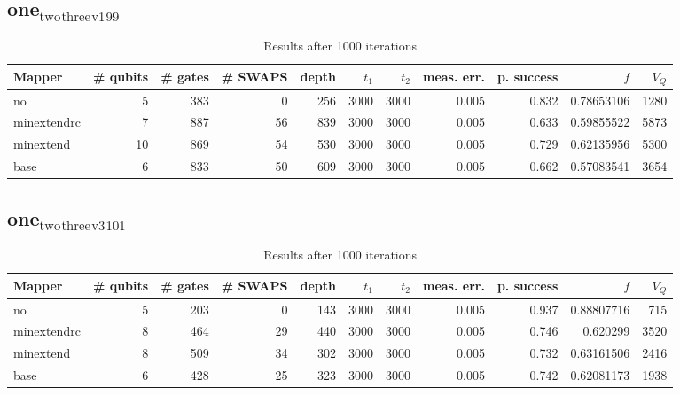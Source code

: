 \documentclass[11pt]{article}
\begin{document}
\subsection{one\(_{\text{two}}\)\(_{\text{three}}\)\(_{\text{v1}}\)\(_{\text{99}}\)}
\label{sec:orga4abd3a}
\begin{table}[!htpb]
\caption{\label{tab:org3e0df40}
Results after 1000 iterations}
\centering
\begin{tabular}{lrrrrrrrrrr}
\hline
Mapper & \# qubits & \# gates & \# SWAPS & depth & \(t_1\) & \(t_2\) & meas. err. & p. success & \(f\) & \(V_Q\)\\
\hline
no & 5 & 383 & 0 & 256 & 3000 & 3000 & 0.005 & 0.832 & 0.78653106 & 1280\\
\hline
minextendrc & 7 & 887 & 56 & 839 & 3000 & 3000 & 0.005 & 0.633 & 0.59855522 & 5873\\
minextend & 10 & 869 & 54 & 530 & 3000 & 3000 & 0.005 & 0.729 & 0.62135956 & 5300\\
base & 6 & 833 & 50 & 609 & 3000 & 3000 & 0.005 & 0.662 & 0.57083541 & 3654\\
\hline
\end{tabular}
\end{table}
\subsection{one\(_{\text{two}}\)\(_{\text{three}}\)\(_{\text{v3}}\)\(_{\text{101}}\)}
\label{sec:org49c50e2}
\begin{table}[!htpb]
\caption{\label{tab:org4a4dd81}
Results after 1000 iterations}
\centering
\begin{tabular}{lrrrrrrrrrr}
\hline
Mapper & \# qubits & \# gates & \# SWAPS & depth & \(t_1\) & \(t_2\) & meas. err. & p. success & \(f\) & \(V_Q\)\\
\hline
no & 5 & 203 & 0 & 143 & 3000 & 3000 & 0.005 & 0.937 & 0.88807716 & 715\\
\hline
minextendrc & 8 & 464 & 29 & 440 & 3000 & 3000 & 0.005 & 0.746 & 0.620299 & 3520\\
minextend & 8 & 509 & 34 & 302 & 3000 & 3000 & 0.005 & 0.732 & 0.63161506 & 2416\\
base & 6 & 428 & 25 & 323 & 3000 & 3000 & 0.005 & 0.742 & 0.62081173 & 1938\\
\hline
\end{tabular}
\end{table}
\end{document}
